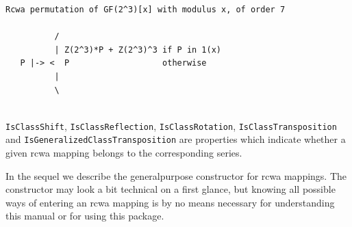 \documentclass[a4paper,11pt]{report}
\begin{document}
{{{\begin{Verbatim}[commandchars=!@A,fontsize=\small,frame=single,label=Example]
  Rcwa permutation of GF(2^3)[x] with modulus x, of order 7
  
          /
          | Z(2^3)*P + Z(2^3)^3 if P in 1(x)
   P |-> <  P                   otherwise
          |
          \
  
\end{Verbatim}
 }

      \texttt{IsClassShift}, \texttt{IsClassReflection}, \texttt{IsClassRotation}, \texttt{IsClassTransposition} and \texttt{IsGeneralizedClassTransposition} are properties which indicate whether a given rcwa mapping belongs to the
corresponding series. 

 In the sequel we describe the general\texttt{}purpose constructor
for rcwa mappings. The constructor may look a bit technical on a first glance,
but knowing all possible ways of entering an rcwa mapping is by no means
necessary for understanding this manual or for using this package. 
}}
\end{document}
